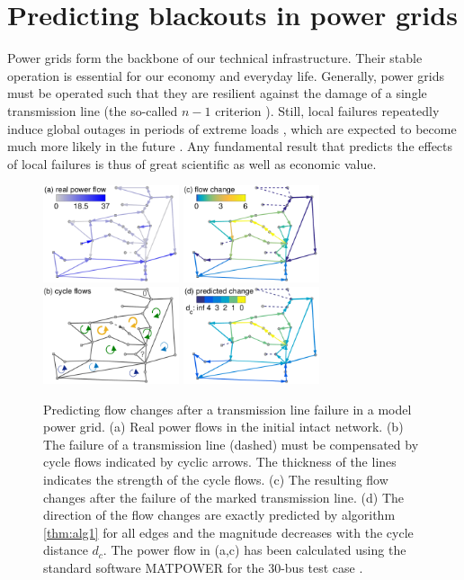 \documentclass[10pt,aps,pra,twocolumn,superscriptaddress]{revtex4-1}
\begin{document}
\section{Predicting blackouts in power grids}
\label{sec:powergrid}

Power grids form the backbone of our technical infrastructure. Their stable operation is essential for our economy and everyday life. Generally, power grids must be operated such that they are resilient against the damage of a single transmission line (the so-called $n-1$ criterion \cite{UCTE04}). Still,  local failures repeatedly induce global outages in periods of extreme loads \cite{Pour06,UCTE07}, which are expected to become much more likely in the future \cite{Pesc14}. Any fundamental result that predicts the effects of local failures is thus of great scientific as well as economic value.


\begin{figure}[tb]
\includegraphics[width=4cm]{pics/case30c_flow2.pdf}
\includegraphics[width=4cm]{pics/case30c_fchange_num2.pdf} \\ [5mm]
\includegraphics[width=4cm]{pics/case30c_cycles2.pdf}
\includegraphics[width=4cm]{pics/case30c_fchange_pred2.pdf}
\caption{
\label{fig:case30}
Predicting flow changes after a transmission line failure in a model power grid.
(a) Real power flows in the initial intact network.
(b) The failure of a transmission line (dashed) must be compensated by cycle flows indicated by
cyclic arrows. The thickness of the lines indicates the strength of the cycle flows. 
(c) The resulting flow changes after the failure of the marked transmission line.
(d) The direction of the flow changes are exactly predicted by algorithm \ref{thm:alg1}
for all edges and the magnitude decreases with the cycle distance $d_c$.
The power flow in (a,c) has been calculated using the standard software 
MATPOWER for the 30-bus test case \cite{MATPOWER}.
}
\end{figure}
\end{document}
